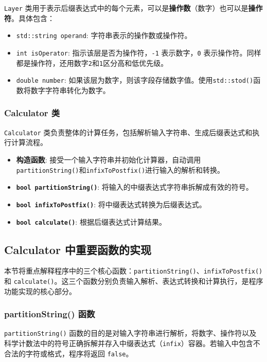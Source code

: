 \documentclass[UTF8]{ctexart}
\begin{document}
\texttt{Layer} 类用于表示后缀表达式中的每个元素，可以是\textbf{操作数}（数字）也可以是\textbf{操作符}。具体包含：
\begin{itemize}
    \item \texttt{std::string operand}: 字符串表示的操作数或操作符。
    \item \texttt{int isOperator}: 指示该层是否为操作符，\texttt{-1} 表示数字，\texttt{0} 表示操作符。同样都是操作符，还用数字\texttt{2}和\texttt{1}区分高和低优先级。
    \item \texttt{double number}: 如果该层为数字，则该字段存储数字值。使用\texttt{std::stod()}函数将数字字符串转化为数字。
\end{itemize}

\subsubsection{Calculator 类}

\texttt{Calculator} 类负责整体的计算任务，包括解析输入字符串、生成后缀表达式和执行计算流程。

\begin{itemize}
    \item \textbf{构造函数}: 接受一个输入字符串并初始化计算器，自动调用\texttt{partitionString()}和\texttt{infixToPostfix()}进行输入的解析和转换。
    \item \textbf{\texttt{bool partitionString()}}: 将输入的中缀表达式字符串拆解成有效的符号。
    \item \textbf{\texttt{bool infixToPostfix()}}: 将中缀表达式转换为后缀表达式。
    \item \textbf{\texttt{bool calculate()}}: 根据后缀表达式计算结果。
\end{itemize}

\subsection{Calculator 中重要函数的实现}

本节将重点解释程序中的三个核心函数：\texttt{partitionString()}、\texttt{infixToPostfix()} 和 \texttt{calculate()}。这三个函数分别负责输入解析、表达式转换和计算执行，是程序功能实现的核心部分。

\subsubsection{partitionString() 函数}

\texttt{partitionString()} 函数的目的是对输入字符串进行解析，将数字、操作符以及科学计数法中的符号正确拆解并存入中缀表达式（\texttt{infix}）容器。若输入中包含不合法的字符或格式，程序将返回 \texttt{false}。
\end{document}
